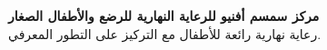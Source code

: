 {\textbf{مركز سمسم أفنيو للرعاية النهارية للرضع والأطفال الصغار}}\\
رعاية نهارية رائعة للأطفال مع التركيز على التطور المعرفي.\\
\vspace*{2mm}